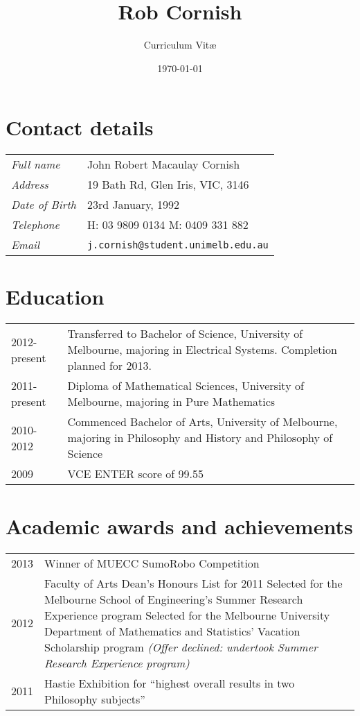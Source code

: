 \documentclass[12pt,a4paper]{article}
\title{\bfseries \huge Rob Cornish}
\author{Curriculum Vit\ae}
\date{\today}
\newenvironment{llist}
	{\renewcommand{\arraystretch}{1.5}\begin{tabular}{p{3cm} p{12cm}}}
	{\end{tabular}}
\begin{document}
\maketitle

\thispagestyle{empty}

\section*{Contact details}
\begin{llist}
	\textit{Full name} & John Robert Macaulay Cornish \\
	\textit{Address} & 19 Bath Rd, Glen Iris, VIC, 3146 \\
	\textit{Date of Birth} & 23rd January, 1992 \\
	\textit{Telephone} & H: 03 9809 0134 \newline M: 0409 331 882 \\
	\textit{Email} & \texttt{j.cornish@student.unimelb.edu.au}
\end{llist}

\section*{Education}
\begin{llist}
	2012-present & Transferred to Bachelor of Science, University of Melbourne, majoring in Electrical Systems. Completion planned for 2013. \\
	2011-present & Diploma of Mathematical Sciences, University of Melbourne, majoring in Pure Mathematics \\
	2010-2012 & Commenced Bachelor of Arts, University of Melbourne, majoring in Philosophy and History and Philosophy of Science \\
	2009 & VCE ENTER score of 99.55 \\
\end{llist}

\section*{Academic awards and achievements}
\begin{llist}
	2013 & Winner of MUECC SumoRobo Competition \\
	2012 & Faculty of Arts Dean's Honours List for 2011 \newline \newline
         Selected for the Melbourne School of Engineering's Summer Research
         Experience program \newline \newline
         Selected for the Melbourne University Department of Mathematics and
         Statistics' Vacation Scholarship program \textit{(Offer declined:
         undertook Summer Research Experience program)} \\
	2011 & Hastie Exhibition for ``highest overall results in two Philosophy subjects''
\end{llist}
\end{document}
